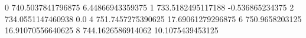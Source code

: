 0 740.5037841796875 6.44866943359375
1 733.5182495117188 -0.536865234375
2 734.0551147460938 0.0
4 751.7457275390625 17.69061279296875
6 750.9658203125 16.91070556640625
8 744.1626586914062 10.1075439453125
